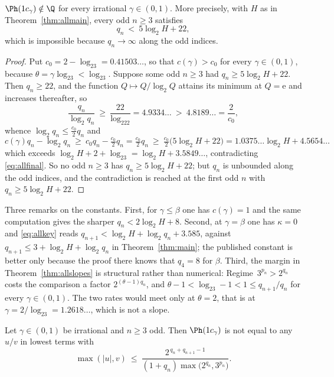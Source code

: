\begin{theorem}\label{thm:allslopes}
$\Ph(1c_\gamma)\notin\Q$ for every irrational $\gamma\in(0,1)$. More precisely,
with $H$ as in Theorem~\ref{thm:allmain}, every odd $n\ge3$ satisfies
\begin{equation}\label{eq:allfire}
q_n\ <\ 5\log_2H+22 ,
\end{equation}
which is impossible because $q_n\to\infty$ along the odd indices.
\end{theorem}

\begin{proof}
Put $c_0=2-\log_23=0.41503\ldots$, so that $c(\gamma)>c_0$ for every
$\gamma\in(0,1)$, because $\theta=\gamma\log_23<\log_23$. Suppose some odd
$n\ge3$ had $q_n\ge5\log_2H+22$. Then $q_n\ge22$, and the function
$Q\mapsto Q/\log_2Q$ attains its minimum at $Q=\mathrm e$ and increases
thereafter, so
\[
\frac{q_n}{\log_2q_n}\ \ge\ \frac{22}{\log_222}=4.9334\ldots\ >\ 4.8189\ldots=\frac{2}{c_0},
\]
whence $\log_2q_n\le\tfrac{c_0}{2}q_n$ and
\[
c(\gamma)q_n-\log_2q_n\ \ge\ c_0q_n-\tfrac{c_0}{2}q_n=\tfrac{c_0}{2}q_n
\ \ge\ \tfrac{c_0}{2}\bigl(5\log_2H+22\bigr)
=1.0375\ldots\log_2H+4.5654\ldots
\]
which exceeds $\log_2H+2+\log_23=\log_2H+3.5849\ldots$, contradicting
\eqref{eq:allfinal}. So no odd $n\ge3$ has $q_n\ge5\log_2H+22$; but $q_n$ is
unbounded along the odd indices, and the contradiction is reached at the first
odd $n$ with $q_n\ge5\log_2H+22$.
\end{proof}

\begin{remark}
Three remarks on the constants. First, for $\gamma\le\beta$ one has
$c(\gamma)=1$ and the same computation gives the sharper
$q_n<2\log_2H+8$. Second, at $\gamma=\beta$ one has $\kappa=0$ and
\eqref{eq:allkey} reads $q_{n+1}<\log_2H+\log_2q_n+3.585$, against
$q_{n+1}\le3+\log_2H+\log_2q_n$ in Theorem~\ref{thm:main}; the published
constant is better only because the proof there knows that $q_4=8$ for $\beta$.
Third, the margin in Theorem~\ref{thm:allslopes} is structural rather than
numerical: Regime~$3^{p_n}>2^{q_n}$ costs the comparison a factor
$2^{(\theta-1)q_n}$, and $\theta-1<\log_23-1<1\le q_{n+1}/q_n$ for every
$\gamma\in(0,1)$. The two rates would meet only at $\theta=2$, that is at
$\gamma=2/\log_23=1.2618\ldots$, which is not a slope.
\end{remark}

\begin{corollary}\label{cor:allshadow}
Let $\gamma\in(0,1)$ be irrational and $n\ge3$ odd. Then $\Ph(1c_\gamma)$ is not
equal to any $u/v$ in lowest terms with
\[
\max(|u|,v)\ \le\ \frac{2^{\,q_n+q_{n+1}-1}}{(1+q_n)\max\bigl(2^{q_n},3^{p_n}\bigr)} .
\]
\end{corollary}

